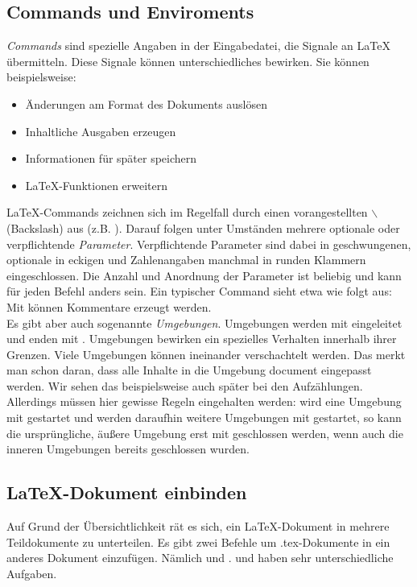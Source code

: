 \subsection{Commands und Enviroments}
\textit{Commands} sind spezielle Angaben in der Eingabedatei, die Signale an \LaTeX \, übermitteln. Diese Signale können unterschiedliches bewirken. Sie können beispielsweise:
\begin{itemize}
	\item Änderungen am Format des Dokuments auslösen
	\item Inhaltliche Ausgaben erzeugen
	\item Informationen für später speichern
	\item LaTeX-Funktionen erweitern
\end{itemize}
\LaTeX -Commands zeichnen sich im Regelfall durch einen vorangestellten $\backslash$(Backslash) aus (z.B. ). Darauf folgen unter Umständen mehrere optionale oder verpflichtende \textit{Parameter}. Verpflichtende Parameter sind dabei in geschwungenen, optionale in eckigen und Zahlenangaben manchmal in runden Klammern eingeschlossen. Die Anzahl und Anordnung der Parameter ist beliebig und kann für jeden Befehl anders sein. Ein typischer Command sieht etwa wie folgt aus:
Mit \umgebung{\%} können Kommentare erzeugt werden. \vspace{6pt}\\
%	
Es gibt aber auch sogenannte \textit{Umgebungen}. Umgebungen werden mit  eingeleitet und enden mit . Umgebungen bewirken ein spezielles Verhalten innerhalb ihrer Grenzen.
Viele Umgebungen können ineinander verschachtelt werden. Das merkt man schon daran, dass alle Inhalte in die Umgebung document eingepasst werden. Wir sehen das beispielsweise auch später bei den Aufzählungen. Allerdings müssen hier gewisse Regeln eingehalten werden: wird eine Umgebung mit  gestartet und werden daraufhin weitere Umgebungen mit  gestartet, so kann die ursprüngliche, äußere Umgebung erst mit  geschlossen werden, wenn auch die inneren Umgebungen bereits geschlossen wurden.

\subsection{\LaTeX -Dokument einbinden}
Auf Grund der Übersichtlichkeit rät es sich, ein \LaTeX -Dokument in mehrere Teildokumente zu unterteilen. Es gibt zwei Befehle um .tex-Dokumente in ein anderes Dokument einzufügen. Nämlich  und .
 und  haben sehr unterschiedliche Aufgaben.\vspace{6pt}

